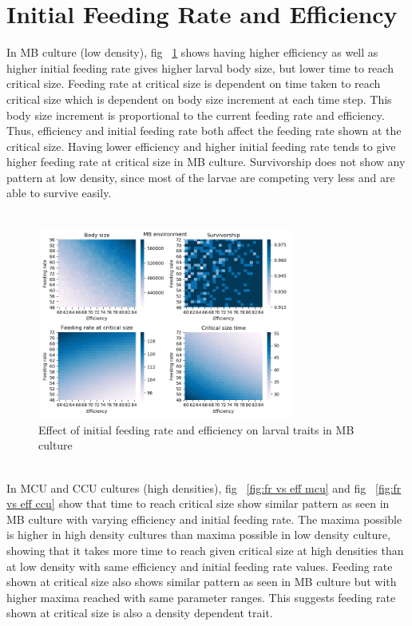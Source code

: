 \section{Initial Feeding Rate and Efficiency}
In MB culture (low density), fig ~\ref{fig:fr vs eff mb} shows having higher efficiency as well as higher initial feeding rate gives higher larval body size, but lower time to reach critical size. Feeding rate at critical size is dependent on time taken to reach critical size which is dependent on body size increment at each time step. This body size increment is proportional to the current feeding rate and efficiency. Thus, efficiency and initial feeding rate both affect the feeding rate shown at the critical size. Having lower efficiency and higher initial feeding rate tends to give higher feeding rate at critical size in MB culture. Survivorship does not show any pattern at low density, since most of the larvae are competing very less and are able to survive easily. \\ \\
\begin{figure}[ht]
  \centering
  \includegraphics[width=0.75\textwidth]{C3/Figs/Feeding_rate_vs_Efficiency_MB}
  \caption{Effect of initial feeding rate and efficiency on larval traits in MB culture}
  \label{fig:fr vs eff mb}
\end{figure}\\
In MCU and CCU cultures (high densities), fig ~\ref{fig:fr vs eff mcu} and fig ~\ref{fig:fr vs eff ccu} show that time to reach critical size show similar pattern as seen in MB culture with varying efficiency and initial feeding rate. The maxima possible is higher in high density cultures than maxima possible in low density culture, showing that it takes more time to reach given critical size at high densities than at low density with same efficiency and initial feeding rate values. Feeding rate shown at critical size also shows similar pattern as seen in MB culture but with higher maxima reached with same parameter ranges. This suggests feeding rate shown at critical size is also a density dependent trait.
